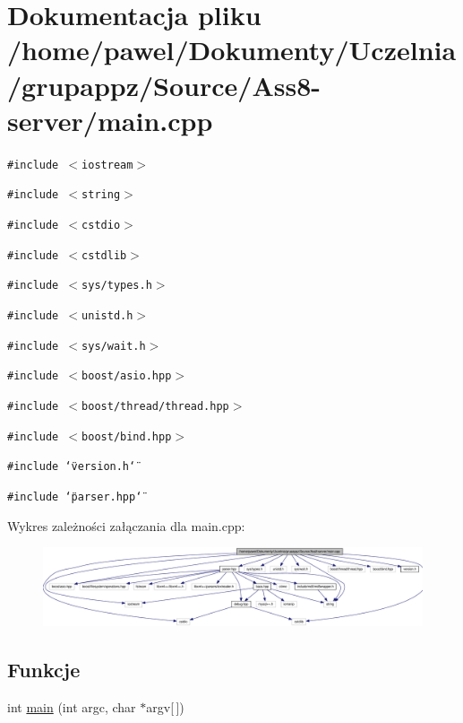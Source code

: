 \hypertarget{a00013}{
\section{Dokumentacja pliku /home/pawel/Dokumenty/Uczelnia/grupappz/Source/Ass8-server/main.cpp}
\label{d7/dd4/a00013}
}
{\tt \#include $<$iostream$>$}\par
{\tt \#include $<$string$>$}\par
{\tt \#include $<$cstdio$>$}\par
{\tt \#include $<$cstdlib$>$}\par
{\tt \#include $<$sys/types.h$>$}\par
{\tt \#include $<$unistd.h$>$}\par
{\tt \#include $<$sys/wait.h$>$}\par
{\tt \#include $<$boost/asio.hpp$>$}\par
{\tt \#include $<$boost/thread/thread.hpp$>$}\par
{\tt \#include $<$boost/bind.hpp$>$}\par
{\tt \#include \char`\"{}version.h\char`\"{}}\par
{\tt \#include \char`\"{}parser.hpp\char`\"{}}\par


Wykres zależności załączania dla main.cpp:\nopagebreak
\begin{figure}[H]
\begin{center}
\leavevmode
\includegraphics[width=420pt]{d6/d97/a00045}
\end{center}
\end{figure}
\subsection*{Funkcje}
\begin{CompactItemize}
\item 
int \hyperlink{a00013_0ddf1224851353fc92bfbff6f499fa97}{main} (int argc, char $\ast$argv\mbox{[}$\,$\mbox{]})
\end{CompactItemize}


